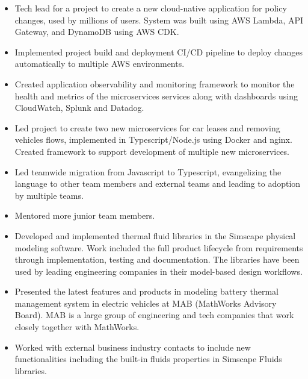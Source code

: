 \documentclass[11pt,a4paper,sans]{moderncv}
\begin{document}
{ \begin{itemize} \itemsep -1pt
  \item Tech lead for a project to create a new cloud-native application for policy changes, used by millions of users. System was built using AWS Lambda, API Gateway, and DynamoDB using AWS CDK.
  \item Implemented project build and deployment CI/CD pipeline to deploy changes automatically to multiple AWS environments.
  \item Created application observability and monitoring framework to monitor the health and metrics of the microservices services along with dashboards using CloudWatch, Splunk and Datadog.
  \item Led project to create two new microservices for car leases and removing vehicles flows, implemented in Typescript/Node.js using Docker and nginx. Created framework to support development of multiple new microservices.
  \item Led teamwide migration from Javascript to Typescript, evangelizing the language to other team members and external teams and leading to adoption by multiple teams.
  \item Mentored more junior team members.
 \end{itemize} }

{ \begin{itemize} \itemsep -1pt
  \item Developed and implemented thermal fluid libraries in the Simscape physical modeling software. Work included the full product lifecycle from requirements through implementation, testing and documentation. The libraries have been used by leading engineering companies in their model-based design workflows. 
  \item Presented the latest features and products in modeling battery thermal management system in electric vehicles at MAB (MathWorks Advisory Board). MAB is a large group of engineering and tech companies that work closely together with MathWorks.
  \item Worked with external business industry contacts to include new functionalities including the built-in fluids properties in Simscape Fluids libraries.
\end{itemize} }
\end{document}
